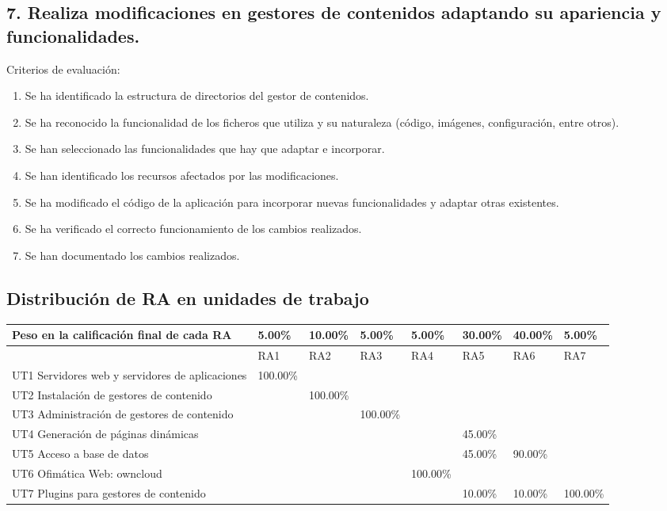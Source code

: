 \documentclass[a4paper]{article}
\begin{document}
\subsection{7. Realiza modificaciones en gestores de contenidos adaptando su apariencia y funcionalidades.}
\label{sec:org000002d}
Criterios de evaluación:
\begin{enumerate}
\item Se ha identificado la estructura de directorios del gestor de contenidos.
\item Se ha reconocido la funcionalidad de los ficheros que utiliza y su naturaleza (código, imágenes, configuración, entre otros).
\item Se han seleccionado las funcionalidades que hay que adaptar e incorporar.
\item Se han identificado los recursos afectados por las modificaciones.
\item Se ha modificado el código de la aplicación para incorporar nuevas funcionalidades y adaptar otras existentes.
\item Se ha verificado el correcto funcionamiento de los cambios realizados.
\item Se han documentado los cambios realizados.
\end{enumerate}


\subsection{Distribución de RA en unidades de trabajo}
\label{sec:org0000030}

\begin{center}
\begin{tabular}{llllllll}
Peso en la calificación final de cada RA & 5.00\% & 10.00\% & 5.00\% & 5.00\% & 30.00\% & 40.00\% & 5.00\%\\[0pt]
\hline
 & RA1 & RA2 & RA3 & RA4 & RA5 & RA6 & RA7\\[0pt]
\hline
UT1 Servidores web y servidores de aplicaciones & 100.00\% &  &  &  &  &  & \\[0pt]
UT2 Instalación de gestores de contenido &  & 100.00\% &  &  &  &  & \\[0pt]
UT3 Administración de gestores de contenido &  &  & 100.00\% &  &  &  & \\[0pt]
UT4 Generación de páginas dinámicas &  &  &  &  & 45.00\% &  & \\[0pt]
UT5 Acceso a base de datos &  &  &  &  & 45.00\% & 90.00\% & \\[0pt]
UT6 Ofimática Web: owncloud &  &  &  & 100.00\% &  &  & \\[0pt]
UT7 Plugins para gestores de contenido &  &  &  &  & 10.00\% & 10.00\% & 100.00\%\\[0pt]
\end{tabular}
\end{center}
\end{document}
